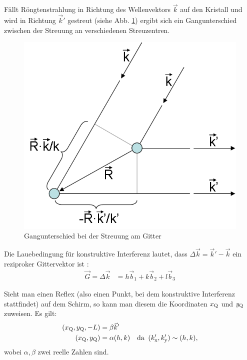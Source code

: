 Fällt Röngtenstrahlung in Richtung des Wellenvektors $\vec{k}$ auf den Kristall und wird in Richtung $\vec{k}'$ gestreut (siehe Abb. \ref{fig:laue_bed}) ergibt sich ein Gangunterschied zwischen der Streuung an verschiedenen Streuzentren. 

\begin{figure}[h]
\centering
\includegraphics[scale=0.75]{data/laue/Laue-Bedingung.png}
\caption{Gangunterschied bei der Streuung am Gitter \cite{wiki_laue_bed}}
\label{fig:laue_bed}
\end{figure}

Die Lauebedingung für konstruktive Interferenz lautet, dass $\Delta \vec{k} = \vec{k}'-\vec{k}$ ein reziproker Gittervektor ist \cite{wiki_laue_bed}:
\begin{align*}
\vec{G} = \Delta \vec{k} &= h\vec{b}_1 + k\vec{b}_2 + l\vec{b}_3
\end{align*}

Sieht man einen Reflex (also einen Punkt, bei dem konstruktive Interferenz stattfindet) auf dem Schirm, so kann man diesem die Koordinaten $x_\mathrm{Q}$ und $y_\mathrm{Q}$ zuweisen. Es gilt:
\begin{align}
(x_\mathrm{Q}, y_\mathrm{Q},-L) &= \beta \vec{k}' \label{eq:kprime} \\
(x_\mathrm{Q}, y_\mathrm{Q}) &= \alpha (h,k) & \text{da}\;\;(k_\mathrm{x}',k_\mathrm{y}') \sim (h,k), \nonumber
\end{align}
wobei $\alpha, \beta$ zwei reelle Zahlen sind.


